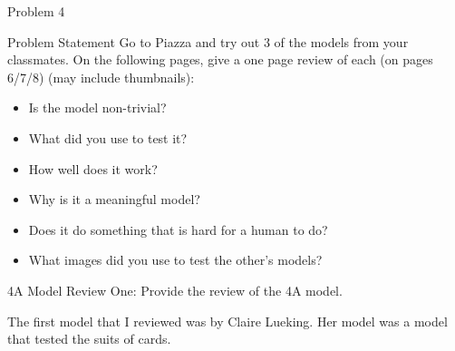 \begin{problem}{Problem 4}
    \begin{statement}{Problem Statement}
        Go to Piazza and try out 3 of the models from your classmates. On the following pages, give a one page review of each (on pages 6/7/8) (may include thumbnails):
        \begin{itemize}
            \item Is the model non-trivial?
            \item What did you use to test it?
            \item How well does it work?
            \item Why is it a meaningful model?
            \item Does it do something that is hard for a human to do?
            \item What images did you use to test the other's models?
        \end{itemize}
    \end{statement}

    \clearpage
    \begin{statement}{4A Model Review One:}
        Provide the review of the 4A model.
    \end{statement}

    \begin{Highlight}[Solution]
        \begin{spacing}{1.50}
            The first model that I reviewed was by Claire Lueking. Her model was a model that tested the suits of cards. 


\end{spacing}
\end{Highlight}
\end{problem}
